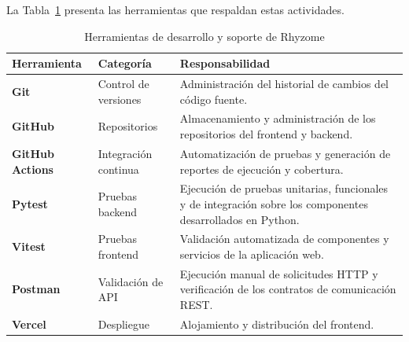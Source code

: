 La Tabla~\ref{tab:herramientas_soporte} presenta las herramientas que respaldan estas actividades.

\begin{table}[htbp]
	\centering
	
	\caption{Herramientas de desarrollo y soporte de Rhyzome}
	\label{tab:herramientas_soporte}
	
	\renewcommand{\arraystretch}{1.5}
	
	\begin{tabularx}{\textwidth}{
			|>{\raggedright\arraybackslash}p{2.8cm}|
			>{\raggedright\arraybackslash}p{2.8cm}|
			>{\raggedright\arraybackslash}X|
		}
		\hline
		
		\rowcolor{gray!15}
		\textbf{Herramienta} &
		\textbf{Categoría} &
		\textbf{Responsabilidad} \\
		
		\hline
		
		\textbf{Git} &
		Control de versiones &
		Administración del historial de cambios del código fuente. \\
		
		\hline
		
		\textbf{GitHub} &
		Repositorios &
		Almacenamiento y administración de los repositorios del frontend y backend. \\
		
		\hline
		
		\textbf{GitHub Actions} &
		Integración continua &
		Automatización de pruebas y generación de reportes de ejecución y cobertura. \\
		
		\hline
		
		\textbf{Pytest} &
		Pruebas backend &
		Ejecución de pruebas unitarias, funcionales y de integración sobre los componentes desarrollados en Python. \\
		
		\hline
		
		\textbf{Vitest} &
		Pruebas frontend &
		Validación automatizada de componentes y servicios de la aplicación web. \\
		
		\hline
		
		\textbf{Postman} &
		Validación de API &
		Ejecución manual de solicitudes HTTP y verificación de los contratos de comunicación REST. \\
		
		\hline
		
		\textbf{Vercel} &
		Despliegue &
		Alojamiento y distribución del frontend. \\
		

\end{tabularx}
\end{table}
